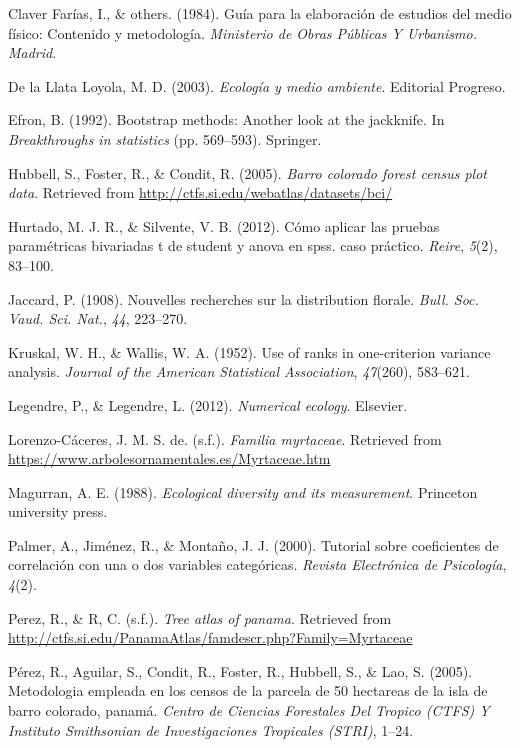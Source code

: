 \documentclass[11pt,]{article}
\begin{document}
\hypertarget{ref-claver1984guia}{}
Claver Farías, I., \& others. (1984). Guía para la elaboración de
estudios del medio físico: Contenido y metodología. \emph{Ministerio de
Obras Públicas Y Urbanismo. Madrid}.

\hypertarget{ref-de2003ecologia}{}
De la Llata Loyola, M. D. (2003). \emph{Ecología y medio ambiente}.
Editorial Progreso.

\hypertarget{ref-efron1992bootstrap}{}
Efron, B. (1992). Bootstrap methods: Another look at the jackknife. In
\emph{Breakthroughs in statistics} (pp. 569--593). Springer.

\hypertarget{ref-Hubbell2005barro}{}
Hubbell, S., Foster, R., \& Condit, R. (2005). \emph{Barro colorado
forest census plot data}. Retrieved from
\url{http://ctfs.si.edu/webatlas/datasets/bci/}

\hypertarget{ref-hurtado2012como}{}
Hurtado, M. J. R., \& Silvente, V. B. (2012). Cómo aplicar las pruebas
paramétricas bivariadas t de student y anova en spss. caso práctico.
\emph{Reire}, \emph{5}(2), 83--100.

\hypertarget{ref-jaccard1908nouvelles}{}
Jaccard, P. (1908). Nouvelles recherches sur la distribution florale.
\emph{Bull. Soc. Vaud. Sci. Nat.}, \emph{44}, 223--270.

\hypertarget{ref-kruskal1952use}{}
Kruskal, W. H., \& Wallis, W. A. (1952). Use of ranks in one-criterion
variance analysis. \emph{Journal of the American Statistical
Association}, \emph{47}(260), 583--621.

\hypertarget{ref-legendre2012numerical}{}
Legendre, P., \& Legendre, L. (2012). \emph{Numerical ecology}.
Elsevier.

\hypertarget{ref-josemyrtaceae}{}
Lorenzo-Cáceres, J. M. S. de. (s.f.). \emph{Familia myrtaceae}.
Retrieved from \url{https://www.arbolesornamentales.es/Myrtaceae.htm}

\hypertarget{ref-magurran1988ecological}{}
Magurran, A. E. (1988). \emph{Ecological diversity and its measurement}.
Princeton university press.

\hypertarget{ref-palmer2000tutorial}{}
Palmer, A., Jiménez, R., \& Montaño, J. J. (2000). Tutorial sobre
coeficientes de correlación con una o dos variables categóricas.
\emph{Revista Electrónica de Psicología}, \emph{4}(2).

\hypertarget{ref-pereztree}{}
Perez, R., \& R, C. (s.f.). \emph{Tree atlas of panama}. Retrieved from
\url{http://ctfs.si.edu/PanamaAtlas/famdescr.php?Family=Myrtaceae}

\hypertarget{ref-perez2005metodologia}{}
Pérez, R., Aguilar, S., Condit, R., Foster, R., Hubbell, S., \& Lao, S.
(2005). Metodologia empleada en los censos de la parcela de 50 hectareas
de la isla de barro colorado, panamá. \emph{Centro de Ciencias
Forestales Del Tropico (CTFS) Y Instituto Smithsonian de Investigaciones
Tropicales (STRI)}, 1--24.
\end{document}
